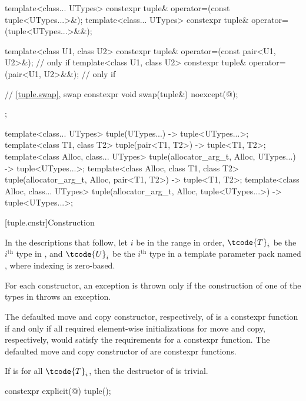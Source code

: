 \begin{codeblock}
{{    template<class... UTypes>
      constexpr tuple& operator=(const tuple<UTypes...>&);
    template<class... UTypes>
      constexpr tuple& operator=(tuple<UTypes...>&&);

    template<class U1, class U2>
      constexpr tuple& operator=(const pair<U1, U2>&);          // only if 
    template<class U1, class U2>
      constexpr tuple& operator=(pair<U1, U2>&&);               // only if 

    // \ref{tuple.swap},  swap
    constexpr void swap(tuple&) noexcept(@\seebelow@);
  };

  template<class... UTypes>
    tuple(UTypes...) -> tuple<UTypes...>;
  template<class T1, class T2>
    tuple(pair<T1, T2>) -> tuple<T1, T2>;
  template<class Alloc, class... UTypes>
    tuple(allocator_arg_t, Alloc, UTypes...) -> tuple<UTypes...>;
  template<class Alloc, class T1, class T2>
    tuple(allocator_arg_t, Alloc, pair<T1, T2>) -> tuple<T1, T2>;
  template<class Alloc, class... UTypes>
    tuple(allocator_arg_t, Alloc, tuple<UTypes...>) -> tuple<UTypes...>;
}
\end{codeblock}

[tuple.cnstr]{Construction}

\pnum
In the descriptions that follow, let $i$ be in the range
 in order, $\tcode{T}_i$
be the $i^\text{th}$ type in , and
$\tcode{U}_i$ be the $i^\text{th}$ type in a template parameter pack named , where indexing
is zero-based.

\pnum
For each  constructor, an exception is thrown only if the construction of
one of the types in  throws an exception.

\pnum
The defaulted move and copy constructor, respectively, of
 is a constexpr function if and only if all
required element-wise initializations for move and copy, respectively,
would satisfy the requirements for a constexpr function. The
defaulted move and copy constructor of  are
constexpr functions.

\pnum
If  is  for all $\tcode{T}_i$,
then the destructor of  is trivial.

%
\begin{itemdecl}
constexpr explicit(@\seebelow@) tuple();
\end{itemdecl}

